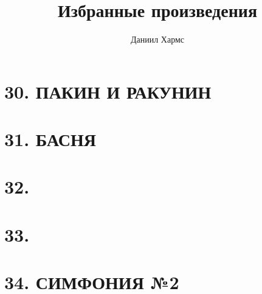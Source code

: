 \documentclass{article}
\begin{document}
\title{Избранные произведения}
\author{Даниил Хармс}
\date{}
\maketitle


\section*{30. ПАКИН И РАКУНИН}


\section*{31. БАСНЯ}


\section*{32.}


\section*{33.}


\section*{34. СИМФОНИЯ №2}

\end{document}
